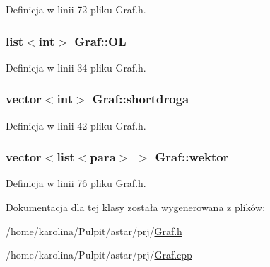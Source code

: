 Definicja w linii 72 pliku Graf.\-h.

\hypertarget{class_graf_a7b668c8a19ae96d9ce221451296093ec}{
\subsubsection[{O\-L}]{\setlength{\rightskip}{0pt plus 5cm}list$<$int$>$ Graf\-::\-O\-L}}\label{class_graf_a7b668c8a19ae96d9ce221451296093ec}


Definicja w linii 34 pliku Graf.\-h.

\hypertarget{class_graf_aaa294459b6beeae74c73cdc825bf42dd}{
\subsubsection[{shortdroga}]{\setlength{\rightskip}{0pt plus 5cm}vector$<$int$>$ Graf\-::shortdroga}}\label{class_graf_aaa294459b6beeae74c73cdc825bf42dd}


Definicja w linii 42 pliku Graf.\-h.

\hypertarget{class_graf_a72ccd052ab732941488da20d198aa82c}{
\subsubsection[{wektor}]{\setlength{\rightskip}{0pt plus 5cm}vector$<$list$<${\bf para}$>$ $>$ Graf\-::wektor}}\label{class_graf_a72ccd052ab732941488da20d198aa82c}


Definicja w linii 76 pliku Graf.\-h.



Dokumentacja dla tej klasy została wygenerowana z plików\-:\begin{DoxyCompactItemize}
\item 
/home/karolina/\-Pulpit/astar/prj/\hyperlink{_graf_8h}{Graf.\-h}\item 
/home/karolina/\-Pulpit/astar/prj/\hyperlink{_graf_8cpp}{Graf.\-cpp}\end{DoxyCompactItemize}
